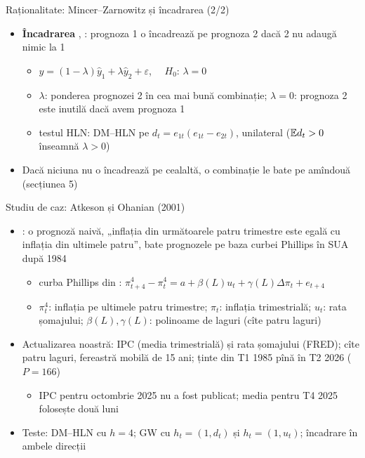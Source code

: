 \begin{frame}{Raționalitate: Mincer--Zarnowitz și încadrarea (2/2)}
\itemsize{\small}
\begin{itemize}
    \item \textbf{Încadrarea} , : prognoza 1 o încadrează pe prognoza 2 dacă 2 nu adaugă nimic la 1
    \begin{itemize}
        \item $y = (1 - \lambda)\hat y_1 + \lambda\hat y_2 + \varepsilon$, $\quad H_0$: $\lambda = 0$
        \item $\lambda$: ponderea prognozei 2 în cea mai bună combinație; $\lambda = 0$: prognoza 2 este inutilă dacă avem prognoza 1
        \item testul HLN: DM--HLN pe $d_t = e_{1t}(e_{1t} - e_{2t})$, unilateral ($\mathbb{E} d_t > 0$ înseamnă $\lambda > 0$)
    \end{itemize}
    \item Dacă niciuna nu o încadrează pe cealaltă, o combinație le bate pe amîndouă (secțiunea 5)
\end{itemize}
\end{frame}

\begin{frame}{Studiu de caz: Atkeson și Ohanian (2001)}
\itemsize{\small}
\begin{itemize}
    \item {}: o prognoză naivă, „inflația din următoarele patru trimestre este egală cu inflația din ultimele patru”, bate prognozele pe baza curbei Phillips în SUA după 1984
    \begin{itemize}
        \item curba Phillips din : $\pi^4_{t+4} - \pi^4_t = a + \beta(L)u_t + \gamma(L)\Delta\pi_t + e_{t+4}$
        \item $\pi^4_t$: inflația pe ultimele patru trimestre; $\pi_t$: inflația trimestrială; $u_t$: rata șomajului; $\beta(L), \gamma(L)$: polinoame de laguri (cîte patru laguri)
    \end{itemize}
    \item Actualizarea noastră: IPC (media trimestrială) și rata șomajului (FRED); cîte patru laguri, fereastră mobilă de 15 ani; ținte din T1 1985 pînă în T2 2026 ($P = 166$)
    \begin{itemize}
        \item IPC pentru octombrie 2025 nu a fost publicat; media pentru T4 2025 folosește două luni
    \end{itemize}
    \item Teste: DM--HLN cu $h = 4$; GW cu $h_t = (1, d_t)$ și $h_t = (1, u_t)$; încadrare în ambele direcții
\end{itemize}
\end{frame}

